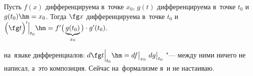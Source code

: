 \label{tprk}
    Пусть $f(x)$ дифференцируема в~точке $x_0$, $g(t)$ дифференцируема в~точке $t_0$ и $g(t_0)\hm=x_0$. Тогда $\fg x$ дифференцируема в~точке $t_0$ и
    $\Big(\fg t\Big)'\Big|_{t_0}\hm=f'\big(\underbrace{g(t_0)}_{x_0}\big)\cdot g'(t_0)$.

    на~языке дифференциалов: $d\fg t\Big|_{t_0}\hm=df\big|_{x_0}\  dg\big|_{t_0}$ "--- между ними ничего не написал, а~это композиция. Сейчас на~формализме я~и не настаиваю.
